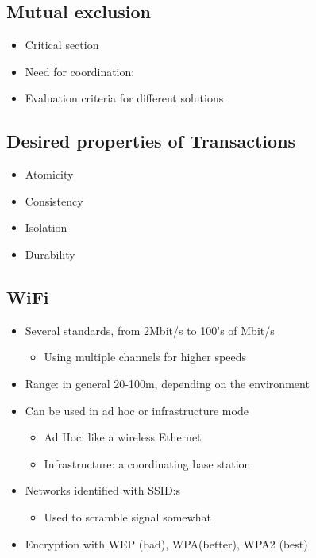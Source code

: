 \subsection{Mutual exclusion}
\begin{itemize}
\item Critical section
\item Need for coordination:
\item Evaluation criteria for different solutions
\end{itemize}


\subsection{Desired properties of Transactions}
\begin{itemize}
\item Atomicity
\item Consistency
\item Isolation
\item Durability
\end{itemize}

\subsection{WiFi}
\begin{itemize}
\item Several standards, from 2Mbit/s to 100’s of Mbit/s
  \begin{itemize}
    \item Using multiple channels for higher speeds
  \end{itemize}
\item Range: in general 20-100m, depending on the environment
\item Can be used in ad hoc or infrastructure mode
  \begin{itemize}
    \item Ad Hoc: like a wireless Ethernet
    \item Infrastructure: a coordinating base station
  \end{itemize}
\item Networks identified with SSID:s
  \begin{itemize}
    \item Used to scramble signal somewhat
  \end{itemize}
\item Encryption with WEP (bad), WPA(better), WPA2 (best)
\end{itemize}

